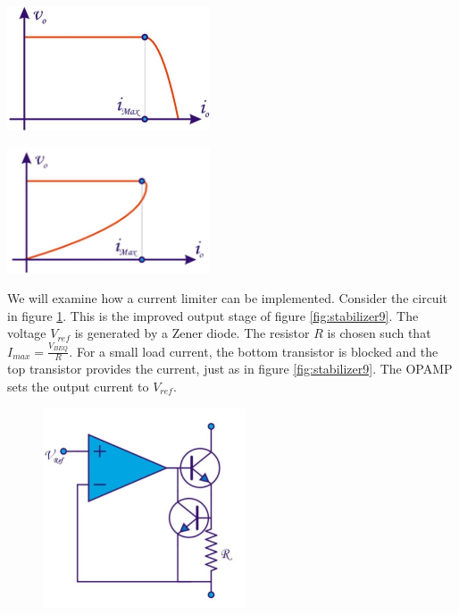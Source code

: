 \begin{minipage}{.5\textwidth}
	\centering
	\includegraphics[width=6cm]{figures/ch12/supply_prot1.jpg}
	\label{fig:supply_prot1}
\end{minipage}%
\begin{minipage}{.5\textwidth}
	\centering
	\includegraphics[width=6cm]{figures/ch12/supply_prot2.jpg}
	\label{fig:supply_prot2}
\end{minipage}

We will examine how a current limiter can be implemented. Consider the circuit in figure \ref{fig:supply_prot3}. This is the improved output stage of figure \ref{fig:stabilizer9}. The voltage $V_{ref}$ is generated by a Zener diode. The resistor $R$ is chosen such that $I_{max} = \frac{V_{BEQ}}{R}$. For a small load current, the bottom transistor is blocked and the top transistor provides the current, just as in figure \ref{fig:stabilizer9}. The OPAMP sets the output current to $V_{ref}$.

\begin{figure}[h!]
	\centering
	\includegraphics[width=6cm]{figures/ch12/supply_prot3.jpg}
	\caption{}
	\label{fig:supply_prot3}
\end{figure}

